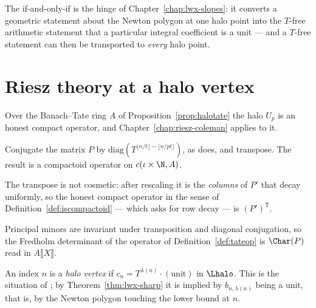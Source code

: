 The if-and-only-if is the hinge of Chapter~\ref{chap:lwx-slopes}: it converts a geometric
statement about the Newton polygon at one halo point into the $T$-free arithmetic statement that
a particular integral coefficient is a unit --- and a $T$-free statement can then be transported
to \emph{every} halo point.

\section{Riesz theory at a halo vertex}
\label{sec:tate-riesz}

Over the Banach--Tate ring $A$ of Proposition~\ref{prop:halotate} the halo $U_p$ is an honest
compact operator, and Chapter~\ref{chap:riesz-coleman} applies to it.

\begin{definition}
  \label{def:tateop}
  \leanok
  Conjugate the matrix $P$ by $\mathrm{diag}(T^{\lfloor n/t\rfloor - \lfloor n/pt\rfloor})$, as
  \cite[proof of Theorem 3.16]{LWX} does, and transpose.  The result is a compactoid operator on
  $c(\iota\times\N, A)$.
\end{definition}

The transpose is not cosmetic: after rescaling it is the \emph{columns} of $P'$ that decay
uniformly, so the honest compact operator in the sense of Definition~\ref{def:iscompactoid} ---
which asks for row decay --- is $(P')^{\mathsf{T}}$.

\begin{proposition}
  \label{prop:tateop-det}
  \leanok
  Principal minors are invariant under transposition and diagonal conjugation, so the Fredholm
  determinant of the operator of Definition~\ref{def:tateop} is $\Char(P)$ read in
  $A\llbracket X\rrbracket$.
\end{proposition}

\begin{definition}
  \label{def:halovertex}
  \leanok
  An index $n$ is a \emph{halo vertex} if $c_n = T^{\lambda(n)}\cdot(\text{unit})$ in $\Lhalo$.
  This is the situation of \cite[Remark 3.25]{LWX}; by Theorem~\ref{thm:lwx-sharp} it is implied
  by $b_{n,\lambda(n)}$ being a unit, that is, by the Newton polygon touching the lower bound at
  $n$.
\end{definition}

